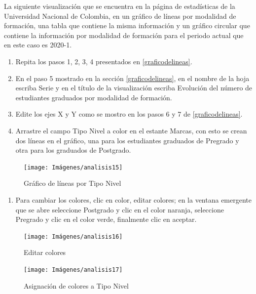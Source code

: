 \documentclass[
]{book}
\providecommand{\tightlist}{%
  \setlength{\itemsep}{0pt}\setlength{\parskip}{0pt}}
\begin{document}
La siguiente visualización que se encuentra en la página de estadísticas de la Universidad Nacional de Colombia, en un gráfico de líneas por modalidad de formación, una tabla que contiene la misma información y un gráfico circular que contiene la información por modalidad de formación para el periodo actual que en este caso es 2020-1.

\begin{enumerate}
\def\labelenumi{\arabic{enumi}.}
\tightlist
\item
  Repita los pasos 1, 2, 3, 4 presentados en \ref{graficodelineas}.
\item
  En el paso 5 mostrado en la sección \ref{graficodelineas}, en el nombre de la hoja escriba Serie y en el título de la visualización escriba Evolución del número de estudiantes graduados por modalidad de formación.
\item
  Edite los ejes X y Y como se mostro en los pasos 6 y 7 de \ref{graficodelineas}.
\item
  Arrastre el campo Tipo Nivel a color en el estante Marcas, con esto se crean dos líneas en el gráfico, una para los estudiantes graduados de Pregrado y otra para los graduados de Postgrado.
\end{enumerate}

\begin{figure}

{\centering \texttt{[image: Imágenes/analisis15]} 

}

\caption{Gráfico de líneas por Tipo Nivel}\label{fig:paso4lineassegmentada-fig}
\end{figure}

\begin{enumerate}
\def\labelenumi{\arabic{enumi}.}
\setcounter{enumi}{4}
\tightlist
\item
  Para cambiar los colores, clic en color, editar colores; en la ventana emergente que se abre seleccione Postgrado y clic en el color naranja, seleccione Pregrado y clic en el color verde, finalmente clic en aceptar.
\end{enumerate}

\begin{figure}

{\centering \texttt{[image: Imágenes/analisis16]} 

}

\caption{Editar colores}\label{fig:paso5lineassegmentada-fig}
\end{figure}

\begin{figure}

{\centering \texttt{[image: Imágenes/analisis17]} 

}

\caption{Asignación de colores a Tipo Nivel}\label{fig:paso5-1lineassegmentada-fig}
\end{figure}
\end{document}
